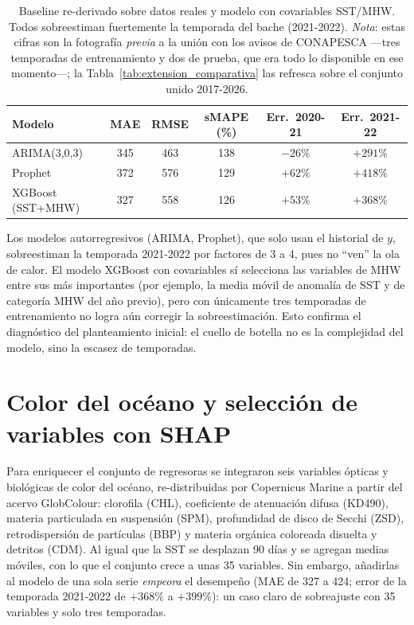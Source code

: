 \begin{table}[htbp]
\centering
\small
\begin{tabular}{lccccc}
\toprule
Modelo & MAE & RMSE & sMAPE (\%) & Err.\ 2020-21 & Err.\ 2021-22 \\
\midrule
ARIMA(3,0,3) & 345 & 463 & 138 & $-26\%$ & $+291\%$ \\
Prophet & 372 & 576 & 129 & $+62\%$ & $+418\%$ \\
XGBoost (SST+MHW) & 327 & 558 & 126 & $+53\%$ & $+368\%$ \\
\bottomrule
\end{tabular}
\caption{Baseline re-derivado sobre datos reales y modelo con covariables SST/MHW. Todos sobreestiman fuertemente la temporada del bache (2021-2022). \emph{Nota}: estas cifras son la fotografía \emph{previa} a la unión con los avisos de CONAPESCA ---tres temporadas de entrenamiento y dos de prueba, que era todo lo disponible en ese momento---; la Tabla~\ref{tab:extension_comparativa} las refresca sobre el conjunto unido 2017-2026.}
\label{tab:extension_floor}
\end{table}

Los modelos autorregresivos (ARIMA, Prophet), que solo usan el historial de $y$, sobreestiman la temporada 2021-2022 por factores de 3 a 4, pues no ``ven'' la ola de calor. El modelo XGBoost con covariables sí selecciona las variables de MHW entre sus más importantes (por ejemplo, la media móvil de anomalía de SST y de categoría MHW del año previo), pero con únicamente tres temporadas de entrenamiento no logra aún corregir la sobreestimación. Esto confirma el diagnóstico del planteamiento inicial: el cuello de botella no es la complejidad del modelo, sino la escasez de temporadas.

\section{Color del océano y selección de variables con SHAP}
Para enriquecer el conjunto de regresoras se integraron seis variables ópticas y biológicas de color del océano, re-distribuidas por Copernicus Marine a partir del acervo GlobColour: clorofila (CHL), coeficiente de atenuación difusa (KD490), materia particulada en suspensión (SPM), profundidad de disco de Secchi (ZSD), retrodispersión de partículas (BBP) y materia orgánica coloreada disuelta y detritos (CDM). Al igual que la SST se desplazan 90 días y se agregan medias móviles, con lo que el conjunto crece a unas 35 variables. Sin embargo, añadirlas al modelo de una sola serie \emph{empeora} el desempeño (MAE de 327 a 424; error de la temporada 2021-2022 de $+368\%$ a $+399\%$): un caso claro de sobreajuste con 35 variables y solo tres temporadas.

